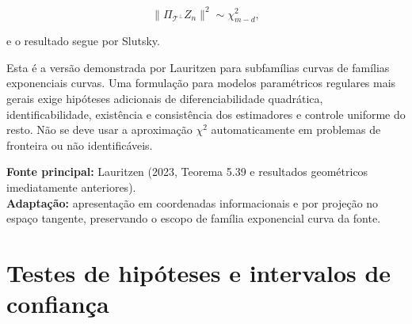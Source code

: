 \documentclass[
  letterpaper,
  DIV=11,
  numbers=noendperiod]{scrreprt}
\begin{document}
\[
\|\Pi_{\mathcal T^\perp}Z_n\|^2
\sim\chi^2_{m-d},
\]

e o resultado segue por Slutsky.

\begin{tcolorbox}[enhanced jigsaw, colback=white, leftrule=.75mm, colbacktitle=quarto-callout-warning-color!10!white, breakable, titlerule=0mm, bottomtitle=1mm, title=\textcolor{quarto-callout-warning-color}{\faExclamationTriangle}\hspace{0.5em}{Escopo e generalização}, colframe=quarto-callout-warning-color-frame, toprule=.15mm, opacityback=0, bottomrule=.15mm, opacitybacktitle=0.6, arc=.35mm, toptitle=1mm, rightrule=.15mm, coltitle=black, left=2mm]

Esta é a versão demonstrada por Lauritzen para subfamílias curvas de
famílias exponenciais curvas. Uma formulação para modelos paramétricos
regulares mais gerais exige hipóteses adicionais de diferenciabilidade
quadrática, identificabilidade, existência e consistência dos
estimadores e controle uniforme do resto. Não se deve usar a aproximação
\(\chi^2\) automaticamente em problemas de fronteira ou não
identificáveis.

\end{tcolorbox}

\begin{tcolorbox}[enhanced jigsaw, colback=white, leftrule=.75mm, colbacktitle=quarto-callout-note-color!10!white, breakable, titlerule=0mm, bottomtitle=1mm, title=\textcolor{quarto-callout-note-color}{\faInfo}\hspace{0.5em}{Fonte da demonstração}, colframe=quarto-callout-note-color-frame, toprule=.15mm, opacityback=0, bottomrule=.15mm, opacitybacktitle=0.6, arc=.35mm, toptitle=1mm, rightrule=.15mm, coltitle=black, left=2mm]

\textbf{Fonte principal:} Lauritzen (2023, Teorema 5.39 e resultados
geométricos imediatamente anteriores).\\
\textbf{Adaptação:} apresentação em coordenadas informacionais e por
projeção no espaço tangente, preservando o escopo de família exponencial
curva da fonte.

\end{tcolorbox}


\chapter*{Testes de hipóteses e intervalos de
confiança}\label{testes-de-hipuxf3teses-e-intervalos-de-confianuxe7a}
\end{document}
